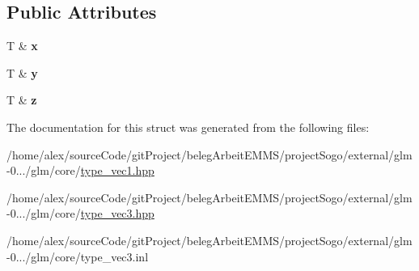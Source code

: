 \subsection*{Public Attributes}
\begin{DoxyCompactItemize}
\item 
\hypertarget{structglm_1_1detail_1_1tref3_a3f14a729db2070ddc283cb51a2f8b356}{T \& {\bfseries x}}\label{structglm_1_1detail_1_1tref3_a3f14a729db2070ddc283cb51a2f8b356}

\item 
\hypertarget{structglm_1_1detail_1_1tref3_a285fa0ec7ea9860e3f0a874214099515}{T \& {\bfseries y}}\label{structglm_1_1detail_1_1tref3_a285fa0ec7ea9860e3f0a874214099515}

\item 
\hypertarget{structglm_1_1detail_1_1tref3_ac35736fe6e6e035b8c0fcb8933de3b3c}{T \& {\bfseries z}}\label{structglm_1_1detail_1_1tref3_ac35736fe6e6e035b8c0fcb8933de3b3c}

\end{DoxyCompactItemize}


The documentation for this struct was generated from the following files\-:\begin{DoxyCompactItemize}
\item 
/home/alex/source\-Code/git\-Project/beleg\-Arbeit\-E\-M\-M\-S/project\-Sogo/external/glm-\/0.../glm/core/\hyperlink{type__vec1_8hpp}{type\-\_\-vec1.\-hpp}\item 
/home/alex/source\-Code/git\-Project/beleg\-Arbeit\-E\-M\-M\-S/project\-Sogo/external/glm-\/0.../glm/core/\hyperlink{type__vec3_8hpp}{type\-\_\-vec3.\-hpp}\item 
/home/alex/source\-Code/git\-Project/beleg\-Arbeit\-E\-M\-M\-S/project\-Sogo/external/glm-\/0.../glm/core/type\-\_\-vec3.\-inl\end{DoxyCompactItemize}
